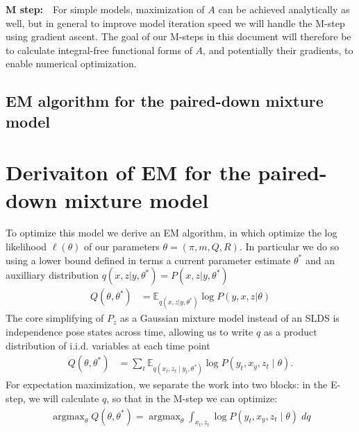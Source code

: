 \documentclass{article}         %
\DeclareMathOperator{\argmax}{\arg\max}
\newcommand{\EE}{\mathbb{E}}
\begin{document}
\textbf{M step:}\ \ For simple models, maximization of $A$ can be achieved analytically as well, but in general to improve model iteration speed we will handle the M-step using gradient ascent. The goal of our M-steps in this document will therefore be to calculate integral-free functional forms of $A$, and potentially their gradients, to enable numerical optimization.


\label{sec:em-results-paired-down}
\subsection{EM algorithm for the paired-down mixture model}



\section{Derivaiton of EM for the paired-down mixture model}

To optimize this model we derive an EM algorithm, in which optimize the log likelihood $\ell(\theta)$ of our parameters $\theta = (\pi, m, Q, R)$. In particular we do so using a lower bound defined in terms a current parameter estimate $\theta^*$ and an auxilliary distribution $q(x, z | y, \theta^*) = P(x, z | y, \theta^*)$
\begin{align}
    Q(\theta, \theta^*) &= \EE_{q(x, z | y, \theta^*)} \log P(y, x, z | \theta)
\end{align}
The core simplifying of $P_z$ as a Gaussian mixture model instead of an SLDS is independence pose states across time, allowing us to write $q$ as a product distribution of i.i.d. variables at each time point
\begin{align}
    Q(\theta, \theta^*) &= \sum_{t} \EE_{q(x_t, z_t \mid y_t, \theta^*)} \log P(y_t, x_y, z_t \mid \theta).
\end{align}
For expectation maximization, we separate the work into two blocks: in the E-step, we will calculate $q$, so that in the M-step we can optimize:
\begin{align}
    \argmax_{\theta} Q(\theta, \theta^*) = \argmax_{\theta} \int_{x_t, z_t} \log P(y_t, x_y, z_t \mid \theta)\; dq 
\end{align}
\end{document}
